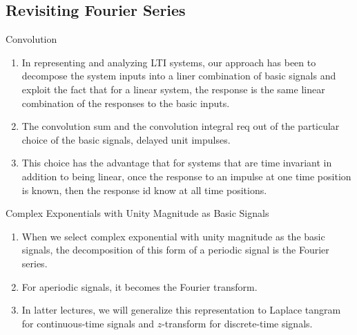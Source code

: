 \subsection{Revisiting Fourier Series}
\begin{frame}{Convolution}
    \begin{enumerate}
      \item In representing and analyzing LTI systems, our approach has been to decompose the system inputs into a liner combination of basic signals and exploit the fact that for a linear system, the response is the same linear combination of the responses to the basic inputs.
      \item The convolution sum and the convolution integral req out of the particular choice of the basic signals, delayed unit impulses.
      \item This choice has the advantage that for systems that are time invariant in addition to being linear, once the response to an impulse at one time position is known, then the response id know at all time positions.
    \end{enumerate}
\end{frame}

\begin{frame}{Complex Exponentials with Unity Magnitude as Basic Signals}
    \begin{enumerate}
      \item When we select complex exponential with unity magnitude as the basic signals, the decomposition of this form of a periodic signal is the Fourier series.
      \item For aperiodic signals, it becomes the Fourier transform.
      \item In latter lectures, we will generalize this representation to Laplace tangram for continuous-time signals and $z$-transform for discrete-time signals.
    \end{enumerate}
\end{frame}

